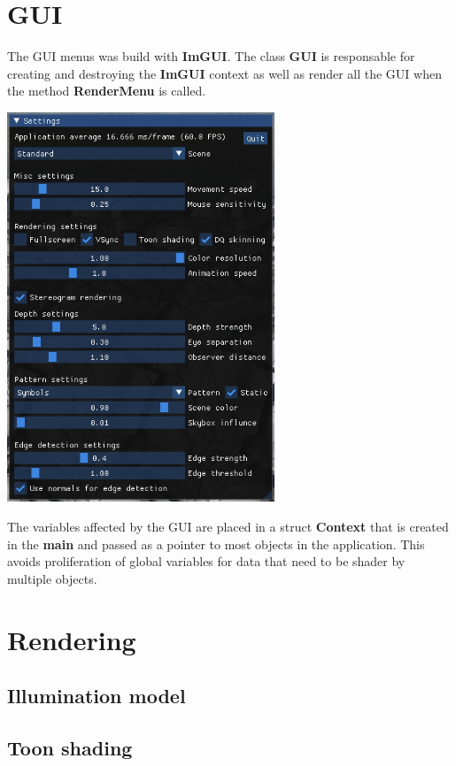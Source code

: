 \documentclass[12pt, a4paper]{article}
\begin{document}
\section{GUI}
The GUI menus was build with \textbf{ImGUI}. The class \textbf{GUI} is responsable for creating and destroying the
\textbf{ImGUI} context as well as render all the GUI when the method \textbf{RenderMenu} is called.
\begin{center}
    \centering
    \includegraphics[width=0.6\textwidth]{img/gui.png}
\end{center}
The variables affected by the GUI are placed in a struct \textbf{Context} that is created in the \textbf{main} and
passed as a pointer to most objects in the application. This avoids proliferation of global variables for data 
that need to be shader by multiple objects.

\section{Rendering}
\subsection{Illumination model}

\subsection{Toon shading}
\end{document}
